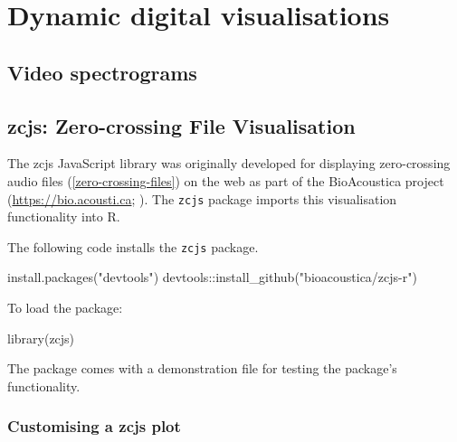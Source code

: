 \documentclass[
]{book}
\newenvironment{Shaded}{\begin{snugshade}}{\end{snugshade}}
\newcommand{\FunctionTok}[1]{\textcolor[rgb]{0.00,0.00,0.00}{#1}}
\newcommand{\NormalTok}[1]{#1}
\newcommand{\SpecialCharTok}[1]{\textcolor[rgb]{0.00,0.00,0.00}{#1}}
\newcommand{\StringTok}[1]{\textcolor[rgb]{0.31,0.60,0.02}{#1}}
\begin{document}
\hypertarget{dynamic-digital-visualisations}{%
\chapter{Dynamic digital visualisations}\label{dynamic-digital-visualisations}}

\hypertarget{video-spectrograms}{%
\section{Video spectrograms}\label{video-spectrograms}}

\hypertarget{zcjs-zero-crossing-file-visualisation}{%
\section{zcjs: Zero-crossing File Visualisation}\label{zcjs-zero-crossing-file-visualisation}}

The zcjs JavaScript library was originally developed for displaying zero-crossing audio files (\ref{zero-crossing-files}) on the web as part of the BioAcoustica project (\url{https://bio.acousti.ca}; \citet{baker2015bioacoustica}). The \texttt{zcjs} package \citep{zcjsr} imports this visualisation functionality into R.

The following code installs the \texttt{zcjs} package.

\begin{Shaded}
\begin{Highlighting}[]
\FunctionTok{install.packages}\NormalTok{(}\StringTok{"devtools"}\NormalTok{)}
\NormalTok{devtools}\SpecialCharTok{::}\FunctionTok{install\_github}\NormalTok{(}\StringTok{"bioacoustica/zcjs{-}r"}\NormalTok{)}
\end{Highlighting}
\end{Shaded}

To load the package:

\begin{Shaded}
\begin{Highlighting}[]
\FunctionTok{library}\NormalTok{(zcjs)}
\end{Highlighting}
\end{Shaded}

The package comes with a demonstration file for testing the package's functionality.

\hypertarget{customising-a-zcjs-plot}{%
\subsection{Customising a zcjs plot}\label{customising-a-zcjs-plot}}
\end{document}
